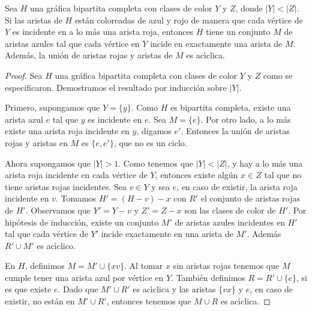 \begin{lema}%
\label{lem:rb-bipGraph}
    Sea $H$ una gr\'afica bipartita completa con clases de color $Y$ y $Z$,
    donde $|Y|<|Z|$. Si las aristas de $H$ est\'an coloreadas de azul y rojo de
    manera que cada v\'ertice de $Y$ es incidente en a lo m\'as una arista roja,
    entonces $H$ tiene un conjunto $M$ de aristas azules tal que cada v\'ertice
    en $Y$ incide en exactamente una arista de $M$. Adem\'as, la uni\'on de
    aristas rojas y aristas de $M$ es ac\'\i{}clica.
\end{lema}

\begin{proof}
    Sea $H$ una gr\'afica bipartita completa con clases de color $Y$ y $Z$ como
    se especificaron. Demostramos el resultado por inducci\'on sobre $|Y|$. 

    Primero, supongamos que $Y=\{y\}$. Como $H$ es bipartita completa, existe
    una arista azul $e$ tal que $y$ es incidente en $e$.   Sea $M = \{ e \}$.
    Por otro lado, a lo m\'as existe una arista roja incidente en $y$, digamos
    $e'$. Entonces la uni\'on de aristas rojas y aristas en $M$ es $\{e, e'\}$,
    que no es un ciclo.

    Ahora supongamos que $|Y|>1$. Como tenemos que $|Y|<|Z|$, y hay a lo m\'as
    una arista roja incidente en cada v\'ertice de $Y$, entonces existe alg\'un
    $x \in Z$ tal que no tiene aristas rojas incidentes. Sea $v \in Y$ y sea
    $e$, en caso de existir, la arista roja incidente en $v$. Tomamos $H'=
    (H-v)-x$ con $R'$ el conjunto de aristas rojas de $H'$. Observamos que $Y' =
    Y- v$ y $Z'= Z- x$ son las clases de color de $H'$. Por hip\'otesis de
    inducci\'on, existe un conjunto $M'$ de aristas azules incidentes en $H'$
    tal que cada v\'ertice de $Y'$ incide exactamente en una arista de $M'$.
    Adem\'as $R'\cup M'$ es ac\'\i{}clico.
    
    En $H$, definimos $M = M'\cup \{xv\}$. Al tomar $x$ sin aristas rojas
    tenemos que $M$ cumple tener una arista azul por v\'ertice en $Y$. Tambi\'en
    definimos $R= R'\cup \{ e \}$, si es que existe $e$.  Dado que  $M'\cup R'$
    es ac\'\i{}clica y las aristas $\{vx\}$ y $e$, en caso de existir, no
    est\'an en $M'\cup R'$, entonces tenemos que $M \cup R$ es ac\'\i{}clica.
\end{proof}

